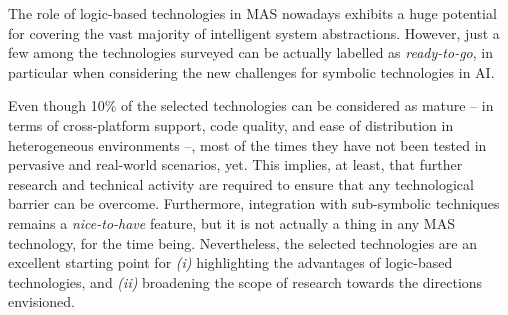\documentclass[12pt,a4paper,openright,twoside]{book}
\begin{document}
The role of logic-based technologies in MAS nowadays exhibits a huge potential for covering the vast majority of intelligent system abstractions.
%
However, just a few among the technologies surveyed can be actually labelled as \emph{ready-to-go}, in particular when considering the new challenges for symbolic technologies in AI.

Even though 10\% of the selected technologies can be considered as mature -- in terms of cross-platform support, code quality, and ease of distribution in heterogeneous environments --, most of the times they have not been tested in pervasive and real-world scenarios, yet.
%
This implies, at least, that further research and technical activity are required to ensure that any technological barrier can be overcome.
%
Furthermore, integration with sub-symbolic techniques remains a \emph{nice-to-have} feature, but it is not actually a thing in any MAS technology, for the time being.
%
Nevertheless, the selected technologies are an excellent starting point for \emph{(i)} highlighting the advantages of logic-based technologies, and  \emph{(ii)} broadening the scope of research towards the directions envisioned.







%
\end{document}
